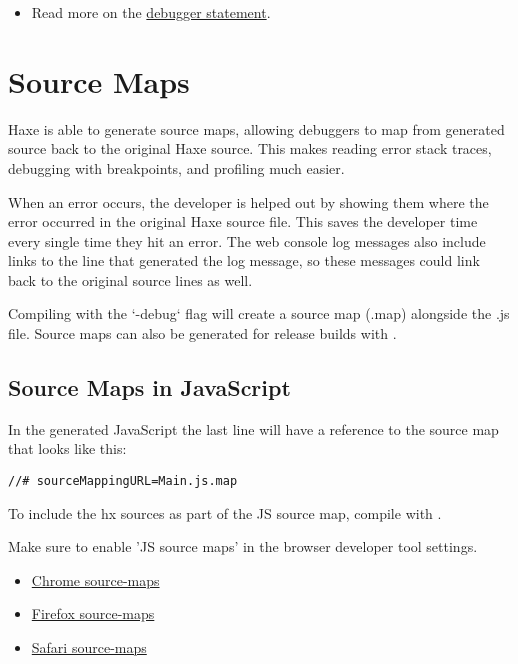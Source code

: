 \begin{itemize}
	\item Read more on the \href{https://developer.mozilla.org/en/docs/Web/JavaScript/Reference/Statements/debugger}{debugger statement}.
\end{itemize}


\section{Source Maps}
\label{debugging-source-map}

Haxe is able to generate source maps, allowing debuggers to map from generated source back to the original Haxe source. This makes reading error stack traces, debugging with breakpoints, and profiling much easier.

When an error occurs, the developer is helped out by showing them where the error occurred in the original Haxe source file. This saves the developer time every single time they hit an error. The web console log messages also include links to the line that generated the log message, so these messages could link back to the original source lines as well. 

Compiling with the `-debug` flag will create a source map (.map) alongside the .js file. Source maps can also be generated for release builds with .


\subsection{Source Maps in JavaScript}
\label{debugging-source-map-javascript}

In the generated JavaScript the last line will have a reference to the source map that looks like this:

\begin{lstlisting}
//# sourceMappingURL=Main.js.map
\end{lstlisting}

To include the hx sources as part of the JS source map, compile with .

Make sure to enable 'JS source maps' in the browser developer tool settings. 

\begin{itemize}
	\item \href{https://developers.google.com/web/tools/chrome-devtools/debug/readability/source-maps}{Chrome source-maps}
	\item \href{https://developer.mozilla.org/en-US/docs/Tools/Debugger/How_to/Use_a_source_map}{Firefox source-maps}
	\item \href{https://developer.apple.com/library/safari/documentation/AppleApplications/Conceptual/Safari_Developer_Guide/ResourcesandtheDOM/ResourcesandtheDOM.html#//apple_ref/doc/uid/TP40007874-CH3-SW2}{Safari source-maps}
\end{itemize}

